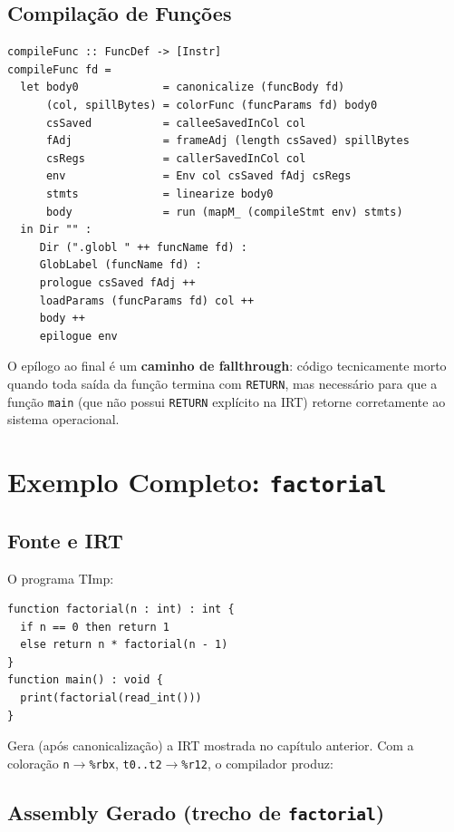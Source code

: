\subsection{Compilação de Funções}

\begin{verbatim}
compileFunc :: FuncDef -> [Instr]
compileFunc fd =
  let body0             = canonicalize (funcBody fd)
      (col, spillBytes) = colorFunc (funcParams fd) body0
      csSaved           = calleeSavedInCol col
      fAdj              = frameAdj (length csSaved) spillBytes
      csRegs            = callerSavedInCol col
      env               = Env col csSaved fAdj csRegs
      stmts             = linearize body0
      body              = run (mapM_ (compileStmt env) stmts)
  in Dir "" :
     Dir (".globl " ++ funcName fd) :
     GlobLabel (funcName fd) :
     prologue csSaved fAdj ++
     loadParams (funcParams fd) col ++
     body ++
     epilogue env
\end{verbatim}

O epílogo ao final é um \textbf{caminho de fallthrough}: código
tecnicamente morto quando toda saída da função termina com \texttt{RETURN},
mas necessário para que a função \texttt{main} (que não possui
\texttt{RETURN} explícito na IRT) retorne corretamente ao sistema operacional.

\section{Exemplo Completo: \texttt{factorial}}

\subsection{Fonte e IRT}

O programa TImp:

\begin{verbatim}
function factorial(n : int) : int {
  if n == 0 then return 1
  else return n * factorial(n - 1)
}
function main() : void {
  print(factorial(read_int()))
}
\end{verbatim}

Gera (após canonicalização) a IRT mostrada no capítulo anterior.
Com a coloração \texttt{n}$\to$\texttt{\%rbx},
\texttt{t0..t2}$\to$\texttt{\%r12},
o compilador produz:

\subsection{Assembly Gerado (trecho de \texttt{factorial})}

